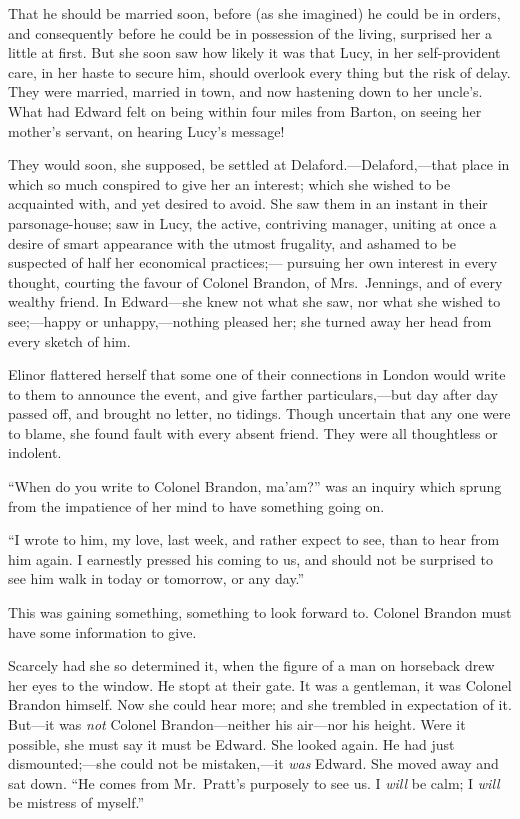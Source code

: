 That he should be married soon, before (as she imagined)
he could be in orders, and consequently before he could
be in possession of the living, surprised her a little
at first.  But she soon saw how likely it was that Lucy,
in her self-provident care, in her haste to secure him,
should overlook every thing but the risk of delay.
They were married, married in town, and now hastening
down to her uncle's.  What had Edward felt on being within
four miles from Barton, on seeing her mother's servant,
on hearing Lucy's message!

They would soon, she supposed, be settled at
Delaford.---Delaford,---that place in which so much
conspired to give her an interest; which she wished
to be acquainted with, and yet desired to avoid.
She saw them in an instant in their parsonage-house; saw
in Lucy, the active, contriving manager, uniting at once
a desire of smart appearance with the utmost frugality,
and ashamed to be suspected of half her economical practices;---%
pursuing her own interest in every thought, courting the
favour of Colonel Brandon, of Mrs.\ Jennings, and of every
wealthy friend.  In Edward---she knew not what she saw,
nor what she wished to see;---happy or unhappy,---nothing
pleased her; she turned away her head from every sketch of him.

Elinor flattered herself that some one of their
connections in London would write to them to announce
the event, and give farther particulars,---but day after
day passed off, and brought no letter, no tidings.
Though uncertain that any one were to blame, she found
fault with every absent friend.  They were all thoughtless
or indolent.

``When do you write to Colonel Brandon, ma'am?''
was an inquiry which sprung from the impatience
of her mind to have something going on.

``I wrote to him, my love, last week, and rather
expect to see, than to hear from him again.  I earnestly
pressed his coming to us, and should not be surprised
to see him walk in today or tomorrow, or any day.''

This was gaining something, something to look forward to.
Colonel Brandon must have some information to give.

Scarcely had she so determined it, when the figure
of a man on horseback drew her eyes to the window.
He stopt at their gate.  It was a gentleman, it
was Colonel Brandon himself.  Now she could hear more;
and she trembled in expectation of it.  But---it was
\emph{not} Colonel Brandon---neither his air---nor his height.
Were it possible, she must say it must be Edward.
She looked again.  He had just dismounted;---she could not be
mistaken,---it \emph{was} Edward.  She moved away and sat down.
``He comes from Mr.\ Pratt's purposely to see us.  I \emph{will} be
calm; I \emph{will} be mistress of myself.''


